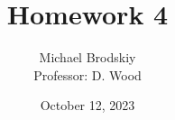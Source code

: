 


\title{Homework 4}
\date{October 12, 2023}
\author{Michael Brodskiy\\ \small Professor: D. Wood}



\maketitle

